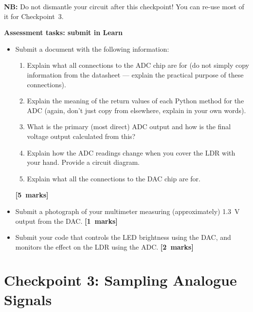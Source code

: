 {\bf NB:} Do not dismantle your circuit after this checkpoint!
You can re-use most of it for Checkpoint~3.

\newpage
{\bf Assessment tasks: submit in Learn}

\begin{itemize}

\item Submit a document with the following information:
\begin{enumerate}
\item Explain what all connections to the ADC chip are for (do not simply copy information from the datasheet --- explain the practical purpose of these connections).
\item Explain the meaning of the return values of each Python method for the ADC (again, don't just copy from elsewhere, explain in your own words).
\item What is the primary (most direct) ADC output and how is the final voltage output calculated from this?
\item Explain how the ADC readings change when you cover the LDR with your hand. Provide a circuit diagram.
\item Explain what all the connections to the DAC chip are for.
\end{enumerate}
\hfill {\bf[5~marks]}

\item Submit a photograph of your multimeter measuring (approximately) 1.3~V output from the DAC.
\null\hfill {\bf[1~marks]}

\item Submit your code that controls the LED brightness using the DAC, and monitors the effect on the LDR using the ADC.
\null\hfill {\bf[2~marks]}


\end{itemize}


\newpage
\section{Checkpoint 3: Sampling Analogue Signals}

